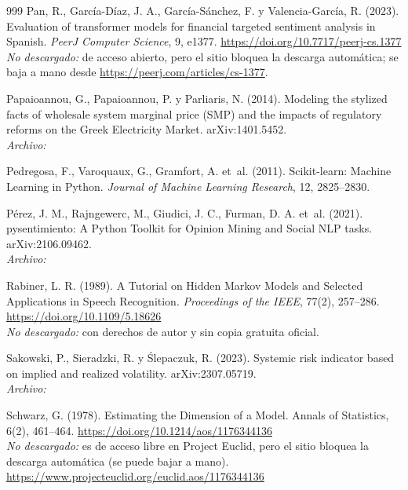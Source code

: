 \begin{thebibliography}{999}
Pan, R., Garc{\'i}a-D{\'i}az, J. A., Garc{\'i}a-S{\'a}nchez, F. y Valencia-Garc{\'i}a, R. (2023). Evaluation of transformer models for financial targeted sentiment analysis in {Spanish}. \emph{PeerJ Computer Science}, 9, e1377. \url{https://doi.org/10.7717/peerj-cs.1377}
\\\textit{No descargado:} de acceso abierto, pero el sitio bloquea la descarga automática; se baja a mano desde \url{https://peerj.com/articles/cs-1377}.

Papaioannou, G., Papaioannou, P. y Parliaris, N. (2014). Modeling the stylized facts of wholesale system marginal price (SMP) and the impacts of regulatory reforms on the Greek Electricity Market. arXiv:1401.5452.
\\\textit{Archivo:} 

Pedregosa, F., Varoquaux, G., Gramfort, A. et~al. (2011). Scikit-learn: Machine Learning in Python. \textit{Journal of Machine Learning Research}, 12, 2825--2830.

P{\'e}rez, J. M., Rajngewerc, M., Giudici, J. C., Furman, D. A. et~al. (2021). pysentimiento: A Python Toolkit for Opinion Mining and Social {NLP} tasks. arXiv:2106.09462.
\\\textit{Archivo:} 

Rabiner, L. R. (1989). A Tutorial on Hidden {Markov} Models and Selected Applications in Speech Recognition. \emph{Proceedings of the IEEE}, 77(2), 257--286. \url{https://doi.org/10.1109/5.18626}
\\\textit{No descargado:} con derechos de autor y sin copia gratuita oficial.

Sakowski, P., Sieradzki, R. y Ślepaczuk, R. (2023). Systemic risk indicator based on implied and realized volatility. arXiv:2307.05719.
\\\textit{Archivo:} 

Schwarz, G. (1978). Estimating the Dimension of a Model. Annals of Statistics, 6(2), 461–464. \url{https://doi.org/10.1214/aos/1176344136}
\\\textit{No descargado:} es de acceso libre en Project Euclid, pero el sitio bloquea la descarga automática (se puede bajar a mano). \url{https://www.projecteuclid.org/euclid.aos/1176344136}


\end{thebibliography}
